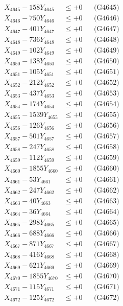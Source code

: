 \documentclass[a4paper,10pt]{article}
\begin{document}
{\begin{align}
X_{4645} - 158Y_{4645} &\leq +0 && \text{(G4645)} \\
X_{4646} - 750Y_{4646} &\leq +0 && \text{(G4646)} \\
X_{4647} - 401Y_{4647} &\leq +0 && \text{(G4647)} \\
X_{4648} - 736Y_{4648} &\leq +0 && \text{(G4648)} \\
X_{4649} - 102Y_{4649} &\leq +0 && \text{(G4649)} \\
X_{4650} - 138Y_{4650} &\leq +0 && \text{(G4650)} \\
\allowbreak
X_{4651} - 105Y_{4651} &\leq +0 && \text{(G4651)} \\
X_{4652} - 212Y_{4652} &\leq +0 && \text{(G4652)} \\
X_{4653} - 437Y_{4653} &\leq +0 && \text{(G4653)} \\
X_{4654} - 174Y_{4654} &\leq +0 && \text{(G4654)} \\
X_{4655} - 1539Y_{4655} &\leq +0 && \text{(G4655)} \\
X_{4656} - 126Y_{4656} &\leq +0 && \text{(G4656)} \\
X_{4657} - 501Y_{4657} &\leq +0 && \text{(G4657)} \\
X_{4658} - 247Y_{4658} &\leq +0 && \text{(G4658)} \\
X_{4659} - 112Y_{4659} &\leq +0 && \text{(G4659)} \\
X_{4660} - 1855Y_{4660} &\leq +0 && \text{(G4660)} \\
\allowbreak
X_{4661} - 53Y_{4661} &\leq +0 && \text{(G4661)} \\
X_{4662} - 247Y_{4662} &\leq +0 && \text{(G4662)} \\
X_{4663} - 40Y_{4663} &\leq +0 && \text{(G4663)} \\
X_{4664} - 36Y_{4664} &\leq +0 && \text{(G4664)} \\
X_{4665} - 298Y_{4665} &\leq +0 && \text{(G4665)} \\
X_{4666} - 688Y_{4666} &\leq +0 && \text{(G4666)} \\
X_{4667} - 871Y_{4667} &\leq +0 && \text{(G4667)} \\
X_{4668} - 416Y_{4668} &\leq +0 && \text{(G4668)} \\
X_{4669} - 621Y_{4669} &\leq +0 && \text{(G4669)} \\
X_{4670} - 1855Y_{4670} &\leq +0 && \text{(G4670)} \\
\allowbreak
X_{4671} - 115Y_{4671} &\leq +0 && \text{(G4671)} \\
X_{4672} - 125Y_{4672} &\leq +0 && \text{(G4672)} \\

\end{align}}
\end{document}
